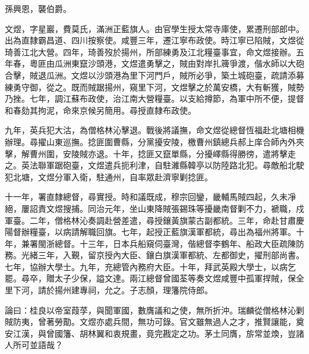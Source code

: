 \begin{pinyinscope}
孫興恩，襲伯爵。

文煜，字星巖，費莫氏，滿洲正藍旗人。由官學生授太常寺庫使，累遷刑部郎中。出為直隸霸昌道、四川按察使。咸豐三年，遷江寧布政使。時江寧已陷賊，文煜從琦善江北大營。四年，琦善歿於揚州，所部練勇及江北糧臺事宜，命文煜接辦。五年春，粵匪由瓜洲東竄沙頭港，文煜遣勇擊之，賊由對岸扎簰爭渡，偕水師以大砲合擊，賊退瓜洲。文煜以沙頭港為里下河門戶，賊所必爭，築土城砲臺，疏請添募練勇守御，從之。既而賊踞揚州，窺里下河，文煜擊之於萬安橋，大有斬獲，賊勢乃挫。七年，調江蘇布政使，治江南大營糧臺。以支給撙節，為軍中所不便，提督和春劾其拘泥，命來京候另簡用。尋授直隸布政使。

九年，英兵犯大沽，為僧格林沁擊退。戰後將議撫，命文煜從總督恆福赴北塘相機辦理。尋擢山東巡撫。捻匪圍曹縣，分黨擾安陵，檄曹州鎮總兵郝上庠合師內外夾擊，解曹州圍，安陵賊亦退。十年，捻匪又竄單縣，分擾嶧縣得勝徬，遣將擊走之。英法聯軍踞砲臺，文煜遣兵扼利津，自駐濰縣韓亭以防陸路北犯。尋敵船北駛犯北塘，文煜分軍入衛，駐通州，自率眾赴濟寧剿捻匪。

十一年，署直隸總督，尋實授。時和議既成，穆宗回鑾，畿輔馬賊四起，久未凈絕，屢詔責文煜搜捕。同治元年，坐山東降賊張錫珠等擾畿南督剿不力，褫職，戍軍臺。二年，僧格林沁奏調赴營差遣，尋授鑲黃旗蒙古副都統。三年，命赴甘肅慶陽督辦糧臺，以病請解職回旗。七年，起授正藍旗漢軍都統，尋出為福州將軍。十年，兼署閩浙總督。十三年，日本兵船窺伺臺灣，偕總督李鶴年、船政大臣疏陳防務。光緒三年，入覲，留京授內大臣、鑲白旗漢軍都統、左都御史，擢刑部尚書。七年，協辦大學士。九年，充總管內務府大臣。十年，拜武英殿大學士，以病乞罷。尋卒，贈太子少保，謚文達。兩江總督曾國荃等奏文煜咸豐中孤軍捍賊，保全里下河，請於揚州建專祠，允之。子志顏，理籓院侍郎。

論曰：桂良以帝室葭莩，與聞軍國，數膺議和之使，無所折沖。瑞麟從僧格林沁剿賊防夷，曾著勞勩。文煜亦處兵間，無功可錄。官文雖無過人之才，推賢讓能，奠安江漢，與曾國籓、胡林翼和衷規畫，竟完戡定之功。茅土同膺，旂常並煥，豈諸人所可並語哉？


\end{pinyinscope}